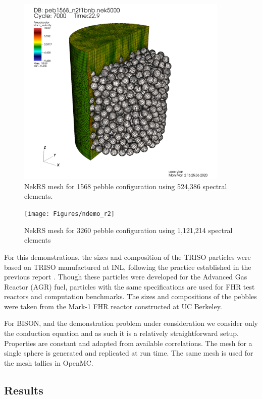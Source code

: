 \begin{figure}[!h]
\centering
\includegraphics[clip=true,width=0.9\textwidth]{Figures/ndemo_r1}
\caption{NekRS mesh for 1568 pebble configuration using 524,386 spectral elements. }
\label{f:ndemo1}
\end{figure}

\begin{figure}[!h]
\centering
\texttt{[image: Figures/ndemo\_r2]}
\caption{NekRS mesh for 3260 pebble configuration using 1,121,214 spectral elements}
\label{f:ndemo2}
\end{figure}

For this demonstrations, the sizes and composition of the TRISO particles were based on TRISO manufactured
at INL, following the practice established in the previous report \cite{cardinal}. Though these particles were developed for the Advanced Gas Reactor (AGR) fuel, particles with the same specifications are used for FHR test reactors and computation benchmarks. The sizes and compositions of the pebbles were taken from the Mark-1 FHR reactor constructed at UC Berkeley.

For BISON, and the demonstration problem under consideration we consider only the conduction equation and as such it is a relatively straightforward setup. Properties are constant and adapted from available correlations. The mesh for a single sphere is generated and replicated at run time. The same mesh is used for the mesh tallies in OpenMC.

\subsection{Results}

